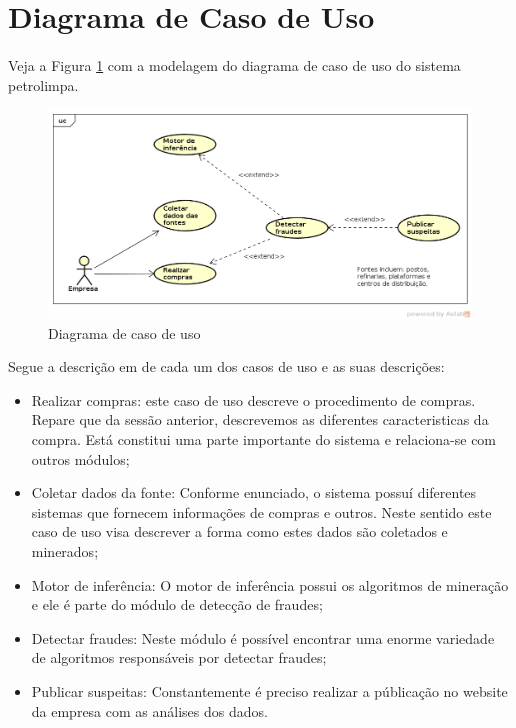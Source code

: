 \documentclass[a4paper,10pt]{article}
\begin{document}
\newpage
\section{Diagrama de Caso de Uso}

\paragraph{}
Veja a Figura \ref{uc} com a modelagem do diagrama de caso de uso do sistema
petrolimpa.

\begin{figure}[ht]
  \centering
  \includegraphics[width=1\textwidth, keepaspectratio=true]{images/uc.png}
  \caption {Diagrama de caso de uso}
  \label {uc}
\end{figure}

Segue a descrição em de cada um dos casos de uso e as suas descrições:

\begin{itemize}
  \item Realizar compras: este caso de uso descreve o procedimento de compras.
        Repare que da sessão anterior, descrevemos as diferentes
        caracteristicas da compra. Está constitui uma parte importante do
        sistema e relaciona-se com outros módulos;
  \item Coletar dados da fonte: Conforme enunciado, o sistema possuí diferentes
        sistemas que fornecem informações de compras e outros. Neste sentido
        este caso de uso visa descrever a forma como estes dados são coletados
        e minerados;
  \item Motor de inferência: O motor de inferência possui os algoritmos de
        mineração e ele é parte do módulo de detecção de fraudes;
  \item Detectar fraudes: Neste módulo é possível encontrar uma enorme
        variedade de algoritmos responsáveis por detectar fraudes;
  \item Publicar suspeitas: Constantemente é preciso realizar a públicação no
        website da empresa com as análises dos dados.
\end{itemize}
\end{document}
